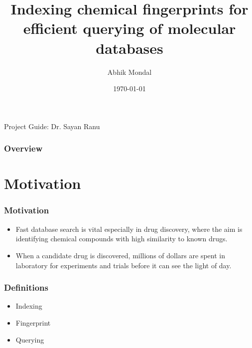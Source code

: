 \documentclass{beamer}
\title[Indexing fingerprints]{Indexing chemical fingerprints for efficient querying of molecular databases} %
\author{Abhik Mondal } %
\institute[IIT Madras] %
{
IIT Madras \\ %
}
\date{\today} %
\begin{document}
\begin{frame}
\titlepage %
Project Guide: Dr. Sayan Ranu
\end{frame}
%

\begin{frame}
\frametitle{Overview} %
\tableofcontents %
\end{frame}




\section{Motivation}

\begin{frame}
\frametitle{Motivation}

\begin{itemize}

	\item<1-> Fast database search is vital especially in drug discovery, where the aim is identifying chemical compounds with high similarity to known drugs.


	\item<2> When a candidate drug is discovered, millions of dollars are spent in laboratory for experiments and trials before it can see the light of day.
	
\end{itemize}

\end{frame}

\begin{frame}
\frametitle{Definitions}

\begin{itemize}
	\item<1-> Indexing
	\item<2->  Fingerprint
	\item<3>  Querying		
\end{itemize}

\end{frame}
\end{document}
